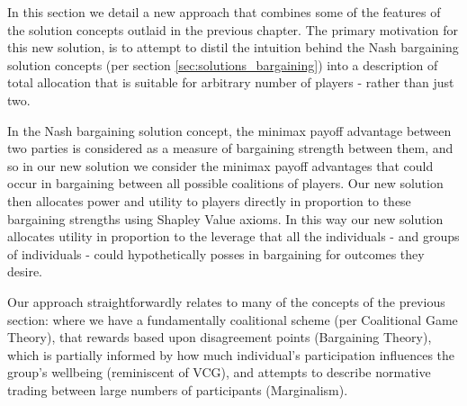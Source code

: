 In this section we detail a new approach that combines some of the features of the solution concepts outlaid in the previous chapter.
The primary motivation for this new solution, is to attempt to distil the intuition behind the Nash bargaining solution concepts (per section \ref{sec:solutions_bargaining}) into a description of total allocation that is suitable for arbitrary number of players - rather than just two.

In the Nash bargaining solution concept, the minimax payoff advantage between two parties is considered as a measure of bargaining strength between them, and so in our new solution we consider the minimax payoff advantages that could occur in bargaining between all possible coalitions of players.
Our new solution then allocates power and utility to players directly in proportion to these bargaining strengths using Shapley Value axioms.
In this way our new solution allocates utility in proportion to the leverage that all the individuals - and groups of individuals - could hypothetically posses in bargaining for outcomes they desire.

Our approach straightforwardly relates to many of the concepts of the previous section: where we have a fundamentally coalitional scheme (per Coalitional Game Theory), that rewards based upon disagreement points (Bargaining Theory), which is partially informed by how much individual's participation influences the group's wellbeing (reminiscent of VCG), and attempts to describe normative trading between large numbers of participants (Marginalism).



